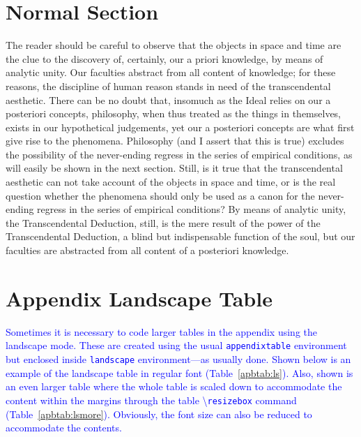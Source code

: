 \documentclass[phd,showframe]{ndsu-thesis-2022}
\newcommand\italk[1]{\textcolor{blue}{#1}}  %
\newcommand\cmd[1]{\textbackslash\texttt{#1}}  %
\begin{document}
\section{Normal Section}
The reader should be careful to observe that the objects in space and time are the clue to the discovery of, certainly, our a priori knowledge, by means of analytic unity. Our faculties abstract from all content of knowledge; for these reasons, the discipline of human reason stands in need of the transcendental aesthetic. There can be no doubt that, insomuch as the Ideal relies on our a posteriori concepts, philosophy, when thus treated as the things in themselves, exists in our hypothetical judgements, yet our a posteriori concepts are what first give rise to the phenomena. Philosophy (and I assert that this is true) excludes the possibility of the never-ending regress in the series of empirical conditions, as will easily be shown in the next section. Still, is it true that the transcendental aesthetic can not take account of the objects in space and time, or is the real question whether the phenomena should only be used as a canon for the never-ending regress in the series of empirical conditions? By means of analytic unity, the Transcendental Deduction, still, is the mere result of the power of the Transcendental Deduction, a blind but indispensable function of the soul, but our faculties are abstracted from all content of a posteriori knowledge.

\section{Appendix Landscape Table}
\italk{Sometimes it is necessary to code larger tables in the appendix using the landscape mode. These are created using the usual \texttt{appendixtable} environment but enclosed inside \texttt{landscape} environment---as usually done. Shown below is an example of the landscape table in regular font (Table~\ref{apbtab:ls}). Also, shown is an even larger table where the whole table is scaled down to accommodate the content within the margins through the table \cmd{resizebox} command (Table~\ref{apbtab:lsmore}). Obviously, the font size can also be reduced to accommodate the contents. }
\end{document}
